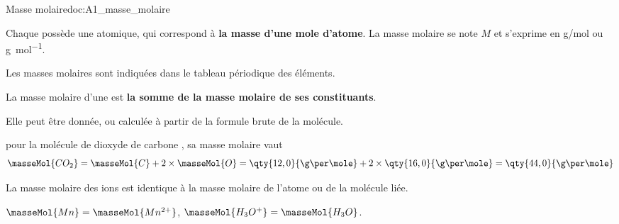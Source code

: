 \newpage
\vspace*{-36pt}
\begin{doc}{Masse molaire}{doc:A1_masse_molaire}
  \begin{encart}
    Chaque  possède une  atomique, qui correspond à \textbf{la masse d'une mole d'atome}.
    La masse molaire se note $M$ et s'exprime en \unit{\g/\mole} ou \unit{\g\per\mole}.
  \end{encart}
  Les masses molaires sont indiquées dans le tableau périodique des éléments.

  \vspace*{-4pt}
  \begin{center}
    \hspace*{40pt}
  \end{center}
  \vspace*{-20pt}

  \begin{encart}
    La masse molaire d'une  est \textbf{la somme de la masse molaire de ses constituants}.
  \end{encart}
  Elle peut être donnée, ou calculée à partir de la formule brute de la molécule.

  \exemple pour la molécule de dioxyde de carbone , sa masse molaire vaut
  \begin{equation*}
    \masseMol{CO_2} = \masseMol{C} + 2 \times \masseMol{O}
    = \qty{12,0}{\g\per\mole} + 2\times\qty{16,0}{\g\per\mole}
    = \qty{44,0}{\g\per\mole}
  \end{equation*}

  \begin{encart}
    La masse molaire des ions est identique à la masse molaire de l'atome ou de la molécule liée.
  \end{encart}

  \exemples $\masseMol{Mn} = \masseMol{Mn^{2+}}$,
  $\masseMol{H_3O^{+}} = \masseMol{H_3O}$.
\end{doc}



